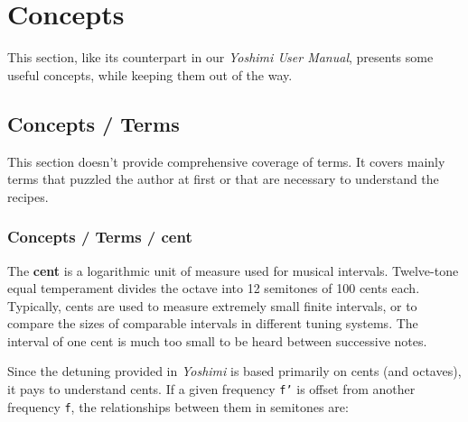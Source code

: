 %
%
%

\section{Concepts}
\label{sec:concepts}

   This section, like its counterpart in our \textsl{Yoshimi User Manual},
   presents some useful concepts, while keeping them out of the way.

\subsection{Concepts / Terms}
\label{subsec:concepts_terms}

   This section doesn't provide comprehensive coverage of terms.  It
   covers mainly terms that puzzled the author at first or that are
   necessary to understand the recipes.

\subsubsection{Concepts / Terms / cent}
\label{subsubsec:concepts_terms_cent}

   The \textbf{cent}
   is a logarithmic unit of measure used for musical
   intervals.  Twelve-tone equal temperament divides the octave into 12
   semitones of 100 cents each. Typically, cents are used to measure
   extremely small finite intervals, or to compare the sizes of comparable
   intervals in different tuning systems.
   The interval of one cent is much too small to be heard between
   successive notes.

   Since the detuning provided in \textsl{Yoshimi} is based primarily on
   cents (and octaves), it pays to understand cents.  If a given frequency
   \texttt{f'} is offset from another frequency \texttt{f}, the
   relationships between them in semitones are:

